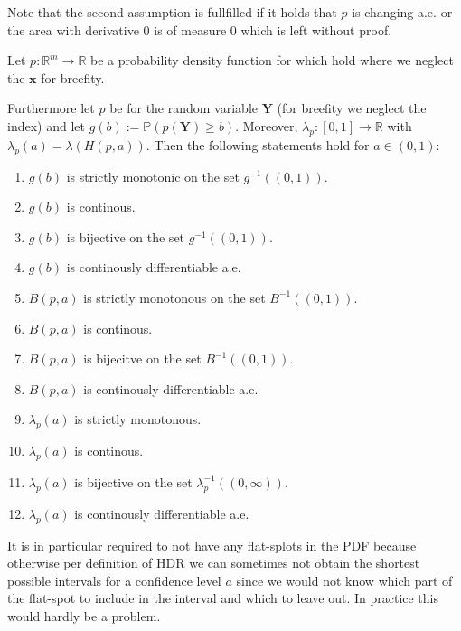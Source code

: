Note that the second assumption is fullfilled if it holds that $p$ is changing a.e. or the area with derivative $0$ is of measure $0$ which is left without proof. %

\begin{lemma}\label{lem:continuity}
    Let \(p: \mathbb{R}^m \to \mathbb{R}\) be a probability density function for which  hold where we neglect the $\mathbf{x}$ for breefity.

    Furthermore let $p$ be for the random variable $\mathbf{Y}$ (for breefity we neglect the index) and let $g(b) := \mathbb{P}(p(\mathbf{Y}) \geq b)$. Moreover, $\lambda_p:[0, 1] \to \mathbb{R}$ with $\lambda_p(a) = \lambda(H(p, a))$. Then the following statements hold for $a \in (0,1)$:

    \begin{enumerate}
        \item $g(b)$ is strictly monotonic on the set $g^{-1}((0,1))$.
        \item $g(b)$ is continous.
        \item $g(b)$ is bijective on the set $g^{-1}((0,1))$.
        \item $g(b)$ is continously differentiable a.e. %
        \item $B(p, a)$ is strictly monotonous on the set $B^{-1}((0,1))$.
        \item $B(p, a)$ is continous.
        \item $B(p, a)$ is bijecitve on the set $B^{-1}((0,1))$.
        \item $B(p, a)$ is continously differentiable a.e. %
        \item $\lambda_p(a)$ is strictly monotonous.
        \item $\lambda_p(a)$ is continous.
        \item $\lambda_p(a)$ is bijective on the set $\lambda_p^{-1}((0,\infty))$.
        \item $\lambda_p(a)$ is continously differentiable a.e. %
    \end{enumerate}
\end{lemma}

It is in particular required to not have any flat-splots in the PDF because otherwise per definition of HDR we can sometimes not obtain the shortest possible intervals for a confidence level $a$ since we would not know which part of the flat-spot to include in the interval and which to leave out. In practice this would hardly be a problem.

